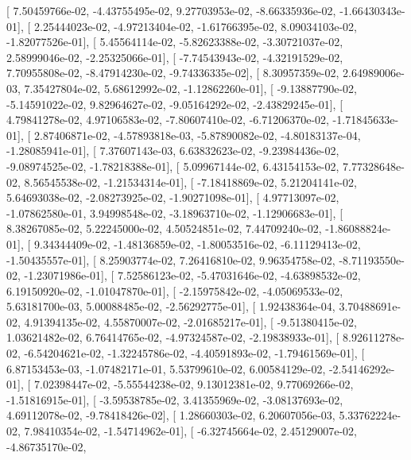 \documentclass{article}
\begin{document}
       [  7.50459766e-02,  -4.43755495e-02,   9.27703953e-02,
         -8.66335936e-02,  -1.66430343e-01],
       [  2.25444023e-02,  -4.97213404e-02,  -1.61766395e-02,
          8.09034103e-02,  -1.82077526e-01],
       [  5.45564114e-02,  -5.82623388e-02,  -3.30721037e-02,
          2.58999046e-02,  -2.25325066e-01],
       [ -7.74543943e-02,  -4.32191529e-02,   7.70955808e-02,
         -8.47914230e-02,  -9.74336335e-02],
       [  8.30957359e-02,   2.64989006e-03,   7.35427804e-02,
          5.68612992e-02,  -1.12862260e-01],
       [ -9.13887790e-02,  -5.14591022e-02,   9.82964627e-02,
         -9.05164292e-02,  -2.43829245e-01],
       [  4.79841278e-02,   4.97106583e-02,  -7.80607410e-02,
         -6.71206370e-02,  -1.71845633e-01],
       [  2.87406871e-02,  -4.57893818e-03,  -5.87890082e-02,
         -4.80183137e-04,  -1.28085941e-01],
       [  7.37607143e-03,   6.63832623e-02,  -9.23984436e-02,
         -9.08974525e-02,  -1.78218388e-01],
       [  5.09967144e-02,   6.43154153e-02,   7.77328648e-02,
          8.56545538e-02,  -1.21534314e-01],
       [ -7.18418869e-02,   5.21204141e-02,   5.64693038e-02,
         -2.08273925e-02,  -1.90271098e-01],
       [  4.97713097e-02,  -1.07862580e-01,   3.94998548e-02,
         -3.18963710e-02,  -1.12906683e-01],
       [  8.38267085e-02,   5.22245000e-02,   4.50524851e-02,
          7.44709240e-02,  -1.86088824e-01],
       [  9.34344409e-02,  -1.48136859e-02,  -1.80053516e-02,
         -6.11129413e-02,  -1.50435557e-01],
       [  8.25903774e-02,   7.26416810e-02,   9.96354758e-02,
         -8.71193550e-02,  -1.23071986e-01],
       [  7.52586123e-02,  -5.47031646e-02,  -4.63898532e-02,
          6.19150920e-02,  -1.01047870e-01],
       [ -2.15975842e-02,  -4.05069533e-02,   5.63181700e-03,
          5.00088485e-02,  -2.56292775e-01],
       [  1.92438364e-04,   3.70488691e-02,   4.91394135e-02,
          4.55870007e-02,  -2.01685217e-01],
       [ -9.51380415e-02,   1.03621482e-02,   6.76414765e-02,
         -4.97324587e-02,  -2.19838933e-01],
       [  8.92611278e-02,  -6.54204621e-02,  -1.32245786e-02,
         -4.40591893e-02,  -1.79461569e-01],
       [  6.87153453e-03,  -1.07482171e-01,   5.53799610e-02,
          6.00584129e-02,  -2.54146292e-01],
       [  7.02398447e-02,  -5.55544238e-02,   9.13012381e-02,
          9.77069266e-02,  -1.51816915e-01],
       [ -3.59538785e-02,   3.41355969e-02,  -3.08137693e-02,
          4.69112078e-02,  -9.78418426e-02],
       [  1.28660303e-02,   6.20607056e-03,   5.33762224e-02,
          7.98410354e-02,  -1.54714962e-01],
       [ -6.32745664e-02,   2.45129007e-02,  -4.86735170e-02,
\end{document}
